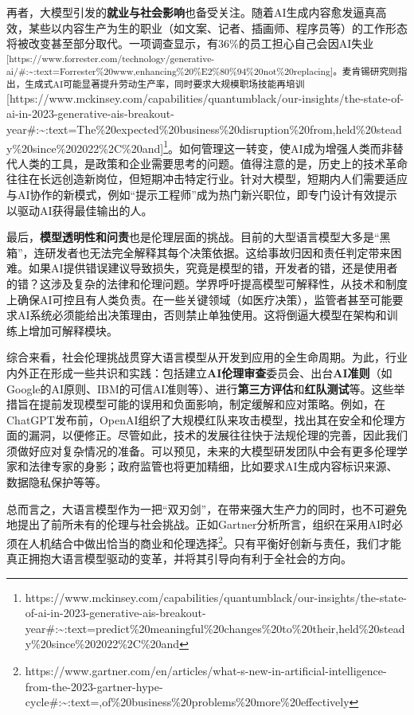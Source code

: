 \documentclass[
  letterpaper,
]{scrbook}
\begin{document}
再者，大模型引发的\textbf{就业与社会影响}也备受关注。随着AI生成内容愈发逼真高效，某些以内容生产为生的职业（如文案、记者、插画师、程序员等）的工作形态将被改变甚至部分取代。一项调查显示，有36\%的员工担心自己会因AI失业\textsuperscript{{[}https://www.forrester.com/technology/generative-ai/\#:\textasciitilde:text=Forrester\%20www,enhancing\%20\%E2\%80\%94\%20not\%20replacing{]}。麦肯锡研究则指出，生成式AI可能显著提升劳动生产率，同时要求大规模职场技能再培训}{[}https://www.mckinsey.com/capabilities/quantumblack/our-insights/the-state-of-ai-in-2023-generative-ais-breakout-year\#:\textasciitilde:text=The\%20expected\%20business\%20disruption\%20from,held\%20steady\%20since\%202022\%2C\%20and{]}\footnote{https://www.mckinsey.com/capabilities/quantumblack/our-insights/the-state-of-ai-in-2023-generative-ais-breakout-year\#:\textasciitilde:text=predict\%20meaningful\%20changes\%20to\%20their,held\%20steady\%20since\%202022\%2C\%20and}。如何管理这一转变，使AI成为增强人类而非替代人类的工具，是政策和企业需要思考的问题。值得注意的是，历史上的技术革命往往在长远创造新岗位，但短期冲击特定行业。针对大模型，短期内人们需要适应与AI协作的新模式，例如``提示工程师''成为热门新兴职位，即专门设计有效提示以驱动AI获得最佳输出的人。

最后，\textbf{模型透明性和问责}也是伦理层面的挑战。目前的大型语言模型大多是``黑箱''，连研发者也无法完全解释其每个决策依据。这给事故归因和责任判定带来困难。如果AI提供错误建议导致损失，究竟是模型的错，开发者的错，还是使用者的错？这涉及复杂的法律和伦理问题。学界呼吁提高模型可解释性，从技术和制度上确保AI可控且有人类负责。在一些关键领域（如医疗决策），监管者甚至可能要求AI系统必须能给出决策理由，否则禁止单独使用。这将倒逼大模型在架构和训练上增加可解释模块。

综合来看，社会伦理挑战贯穿大语言模型从开发到应用的全生命周期。为此，行业内外正在形成一些共识和实践：包括建立\textbf{AI伦理审查}委员会、出台\textbf{AI准则}（如Google的AI原则、IBM的可信AI准则等）、进行\textbf{第三方评估}和\textbf{红队测试}等。这些举措旨在提前发现模型可能的误用和负面影响，制定缓解和应对策略。例如，在ChatGPT发布前，OpenAI组织了大规模红队来攻击模型，找出其在安全和伦理方面的漏洞，以便修正。尽管如此，技术的发展往往快于法规伦理的完善，因此我们须做好应对复杂情况的准备。可以预见，未来的大模型研发团队中会有更多伦理学家和法律专家的身影；政府监管也将更加精细，比如要求AI生成内容标识来源、数据隐私保护等等。

总而言之，大语言模型作为一把``双刃剑''，在带来强大生产力的同时，也不可避免地提出了前所未有的伦理与社会挑战。正如Gartner分析所言，组织在采用AI时必须在人机结合中做出恰当的商业和伦理选择\footnote{https://www.gartner.com/en/articles/what-s-new-in-artificial-intelligence-from-the-2023-gartner-hype-cycle\#:\textasciitilde:text=,of\%20business\%20problems\%20more\%20effectively}。只有平衡好创新与责任，我们才能真正拥抱大语言模型驱动的变革，并将其引导向有利于全社会的方向。
\end{document}
